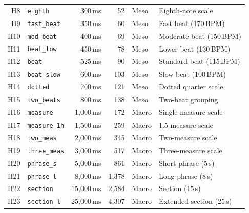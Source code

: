 \begin{longtable}{
  r
  l
  r
  r
  l
  l
}
\rowcolor{orange!8}
H8  & \texttt{eighth}      & 300\,ms    & 52     & Meso  & Eighth-note scale          \\
\rowcolor{orange!8}
H9  & \texttt{fast\_beat}  & 350\,ms    & 60     & Meso  & Fast beat (170\,BPM)       \\
\rowcolor{orange!8}
H10 & \texttt{mod\_beat}   & 400\,ms    & 69     & Meso  & Moderate beat (150\,BPM)   \\
\rowcolor{orange!8}
H11 & \texttt{beat\_low}   & 450\,ms    & 78     & Meso  & Lower beat (130\,BPM)      \\
\rowcolor{orange!8}
H12 & \texttt{beat}        & 525\,ms    & 90     & Meso  & Standard beat (115\,BPM)   \\
\rowcolor{orange!8}
H13 & \texttt{beat\_slow}  & 600\,ms    & 103    & Meso  & Slow beat (100\,BPM)       \\
\rowcolor{orange!8}
H14 & \texttt{dotted}      & 700\,ms    & 121    & Meso  & Dotted quarter scale       \\
\rowcolor{orange!8}
H15 & \texttt{two\_beats}  & 800\,ms    & 138    & Meso  & Two-beat grouping          \\

\rowcolor{green!8}
H16 & \texttt{measure}     & 1{,}000\,ms  & 172    & Macro & Single measure scale       \\
\rowcolor{green!8}
H17 & \texttt{measure\_1h} & 1{,}500\,ms  & 259    & Macro & 1.5 measure scale          \\
\rowcolor{green!8}
H18 & \texttt{two\_meas}   & 2{,}000\,ms  & 345    & Macro & Two-measure scale          \\
\rowcolor{green!8}
H19 & \texttt{three\_meas} & 3{,}000\,ms  & 517    & Macro & Three-measure scale        \\
\rowcolor{green!8}
H20 & \texttt{phrase\_s}   & 5{,}000\,ms  & 861    & Macro & Short phrase (5\,s)        \\
\rowcolor{green!8}
H21 & \texttt{phrase\_l}   & 8{,}000\,ms  & 1{,}378  & Macro & Long phrase (8\,s)         \\
\rowcolor{green!8}
H22 & \texttt{section}     & 15{,}000\,ms & 2{,}584  & Macro & Section (15\,s)            \\
\rowcolor{green!8}
H23 & \texttt{section\_l}  & 25{,}000\,ms & 4{,}307  & Macro & Extended section (25\,s)   \\


\end{longtable}
